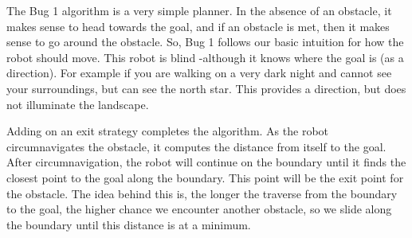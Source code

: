 The Bug 1 algorithm is a very simple planner. In the absence of an
obstacle, it makes sense to head towards the goal, and if an obstacle is
met, then it makes sense to go around the obstacle. So, Bug 1 follows
our basic intuition for how the robot should move. This robot is blind
-although it knows where the goal is (as a direction). For example if
you are walking on a very dark night and cannot see your surroundings,
but can see the north star. This provides a direction, but does not
illuminate the landscape.

Adding on an exit strategy completes the algorithm. As the robot
circumnavigates the obstacle, it computes the distance from itself to
the goal. After circumnavigation, the robot will continue on the
boundary until it finds the closest point to the goal along the
boundary. This point will be the exit point for the obstacle. The idea
behind this is, the longer the traverse from the boundary to the goal,
the higher chance we encounter another obstacle, so we slide along the
boundary until this distance is at a minimum.


